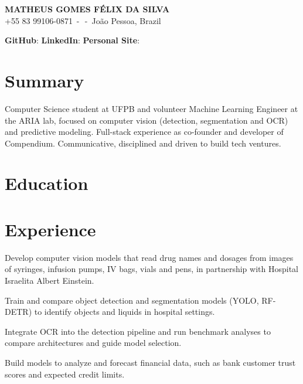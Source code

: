 \documentclass[10pt]{article}
\begin{document}
\begin{center}
  {\LARGE\bfseries MATHEUS GOMES FÉLIX DA SILVA}\\[5pt]
  +55 83 99106-0871 \,-\,  \,-\, João Pessoa, Brazil
\end{center}
\vspace{2pt}

\textbf{GitHub}:  \quad
\textbf{LinkedIn}:  \quad
\textbf{Personal Site}: 

\section{Summary}
Computer Science student at UFPB and volunteer Machine Learning Engineer at the ARIA lab, focused on computer vision (detection, segmentation and OCR) and predictive modeling. Full-stack experience as co-founder and developer of Compendium. Communicative, disciplined and driven to build tech ventures.

\section{Education}

\section{Experience}
\begin{itens}
  \item Develop computer vision models that read drug names and dosages from images of syringes, infusion pumps, IV bags, vials and pens, in partnership with Hospital Israelita Albert Einstein.
  \item Train and compare object detection and segmentation models (YOLO, RF-DETR) to identify objects and liquids in hospital settings.
  \item Integrate OCR into the detection pipeline and run benchmark analyses to compare architectures and guide model selection.
  \item Build models to analyze and forecast financial data, such as bank customer trust scores and expected credit limits.
\end{itens}
\end{document}
